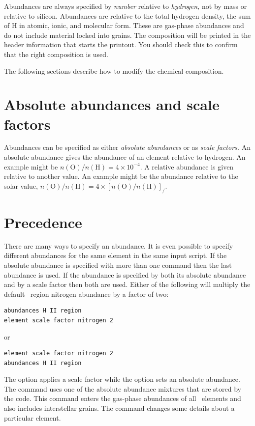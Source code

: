 Abundances are always specified by \emph{number} relative to
\emph{hydrogen,} not by mass or relative to silicon.
Abundances are relative to the total hydrogen
density, the sum of H in atomic, ionic, and molecular form.
These are gas-phase abundances
and do not include material locked into grains.
The
composition will be printed in the header information that starts the
printout.
You should check this to confirm that the right composition is
used.

The following sections describe how to modify the chemical composition.

\section{Absolute abundances and scale factors }

Abundances can be specified as either \emph{absolute abundances} or as
\emph{scale factors.}
An absolute abundance gives the abundance of an element relative
to hydrogen.
An example might be $n(\mathrm{O} ) /n( \mathrm{H} ) = 4 \times 10^{-4}$.
A relative abundance
is given relative to another value.
An example might be the abundance
relative to the solar value, $n(\mathrm{O}) / n(\mathrm{H}) = 4 \times
[n(\mathrm{O})/n(\mathrm{H})]_/$.

\section{Precedence}

There are many ways to specify an abundance.
It is even possible to specify different abundances for the
same element in the same input script.
If the absolute abundance is specified with more than one command then
the last abundance is used.
If the abundance is specified by both its
absolute abundance and by a scale factor then both are used.
Either of
the following will multiply the default \hii\ region nitrogen abundance by
a factor of two:
\begin{verbatim}
abundances H II region
element scale factor nitrogen 2
\end{verbatim}
or
\begin{verbatim}
element scale factor nitrogen 2
abundances H II region
\end{verbatim}
The  option applies a scale factor
while the
 option sets an absolute abundance.
The 
command uses one of the absolute abundance mixtures that are stored
by the code.
This command enters the gas-phase
abundances of all \LIMELM\ elements and also includes interstellar grains.
The  command changes some details about a particular element.

